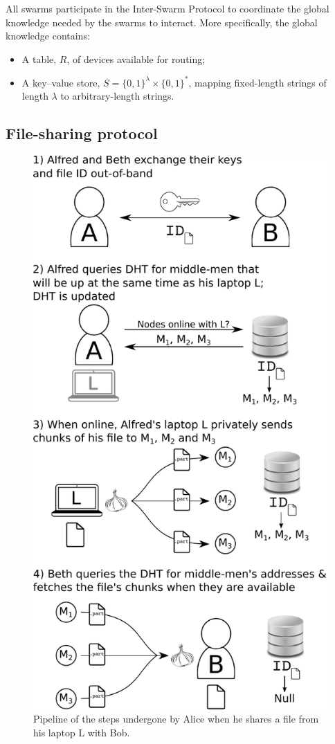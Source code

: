 All swarms participate in the Inter-Swarm Protocol to coordinate the global 
knowledge needed by the swarms to interact.
More specifically, the global knowledge contains:
\begin{itemize}
  \item A table, \(R\), of devices available for routing;
  \item A key--value store, \(S = \{0, 1\}^\lambda\times \{0, 1\}^*\), mapping 
    fixed-length strings of length \(\lambda\) to arbitrary-length strings.
\end{itemize}

\subsection{File-sharing protocol}%
\label{FileSharingProtocol}

\begin{figure}[t]
\centering
\includegraphics[width=0.8\columnwidth]{figures/schema.pdf}
\caption{\label{fig:pipeline}Pipeline of the steps undergone by Alice when he shares a file from his laptop L with Bob.}
\end{figure}

